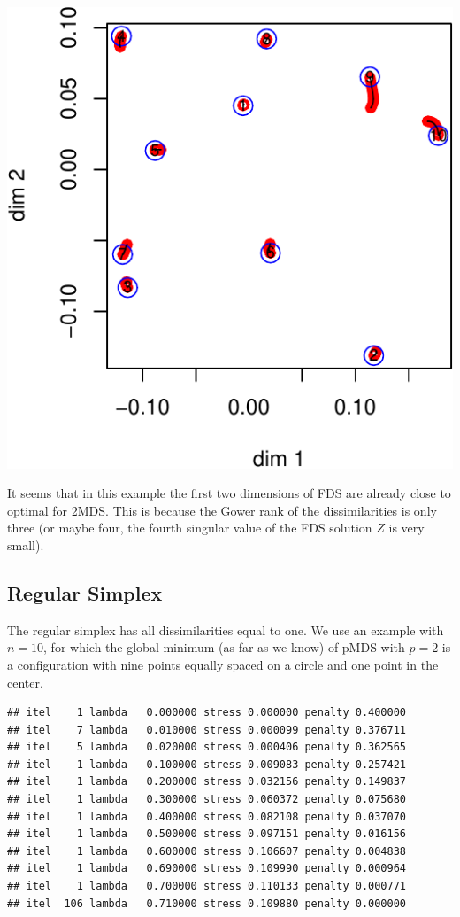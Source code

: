 \documentclass[
  12pt,
]{article}
\begin{document}
\begin{center}\includegraphics{penalty_files/figure-latex/chi-1} \end{center}

It seems that in this example the first two dimensions of FDS are
already close to optimal for 2MDS. This is because the Gower rank of the
dissimilarities is only three (or maybe four, the fourth singular value
of the FDS solution \(Z\) is very small).

\subsection{Regular Simplex}\label{regular-simplex}

The regular simplex has all dissimilarities equal to one. We use an
example with \(n=10\), for which the global minimum (as far as we know)
of pMDS with \(p=2\) is a configuration with nine points equally spaced
on a circle and one point in the center.

\begin{verbatim}
## itel    1 lambda   0.000000 stress 0.000000 penalty 0.400000 
## itel    7 lambda   0.010000 stress 0.000099 penalty 0.376711 
## itel    5 lambda   0.020000 stress 0.000406 penalty 0.362565 
## itel    1 lambda   0.100000 stress 0.009083 penalty 0.257421 
## itel    1 lambda   0.200000 stress 0.032156 penalty 0.149837 
## itel    1 lambda   0.300000 stress 0.060372 penalty 0.075680 
## itel    1 lambda   0.400000 stress 0.082108 penalty 0.037070 
## itel    1 lambda   0.500000 stress 0.097151 penalty 0.016156 
## itel    1 lambda   0.600000 stress 0.106607 penalty 0.004838 
## itel    1 lambda   0.690000 stress 0.109990 penalty 0.000964 
## itel    1 lambda   0.700000 stress 0.110133 penalty 0.000771 
## itel  106 lambda   0.710000 stress 0.109880 penalty 0.000000
\end{verbatim}
\end{document}
